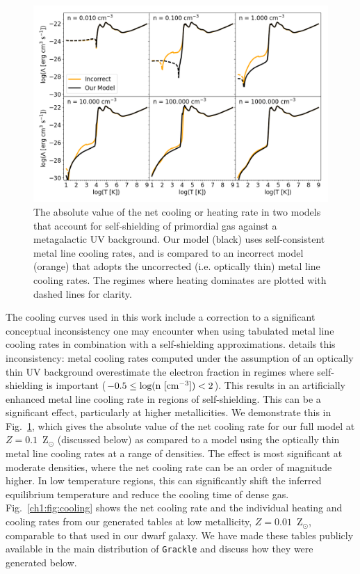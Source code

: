 \begin{figure}
\centering
\includegraphics[width=0.95\linewidth]{figures/ch1/cooling_model_comparison}
\caption{The absolute value of the net cooling or heating rate in two models that account for self-shielding of primordial gas against a metagalactic UV background. Our model (black) uses self-consistent metal line cooling rates, and is compared to an incorrect model (orange) that adopts the uncorrected (i.e. optically thin) metal line cooling rates. The regimes where heating dominates are plotted with dashed lines for clarity.}
\label{ch1:fig:cooling comparison}
\end{figure}


The cooling curves used in this work include a correction to a significant conceptual inconsistency one may encounter when using tabulated metal line cooling rates in combination with a self-shielding approximations. \citet{Hu2017} details this inconsistency: metal cooling rates computed under the assumption of an optically thin UV background overestimate the electron fraction in regimes where self-shielding is important ($-0.5 \leq \rm{log(n~[cm^{-3}])} < 2$). This results in an artificially enhanced metal line cooling rate in regions of self-shielding. This can be a significant effect, particularly at higher metallicities. We demonstrate this in Fig.~\ref{ch1:fig:cooling comparison}, which gives the absolute value of the net cooling rate for our full model at $Z = 0.1$~Z$_{\odot}$ (discussed below) as compared to a model using the optically thin metal line cooling rates at a range of densities. The effect is most significant at moderate densities, where the net cooling rate can be an order of magnitude higher. In low temperature regions, this can significantly shift the inferred equilibrium temperature and reduce the cooling time of dense gas. Fig.~\ref{ch1:fig:cooling} shows the net cooling rate and the individual heating and cooling rates from our generated tables at low metallicity, $Z = 0.01$~Z$_{\odot}$, comparable to that used in our dwarf galaxy. We have made these tables publicly available in the main distribution of \texttt{Grackle} and discuss how they were generated below.

